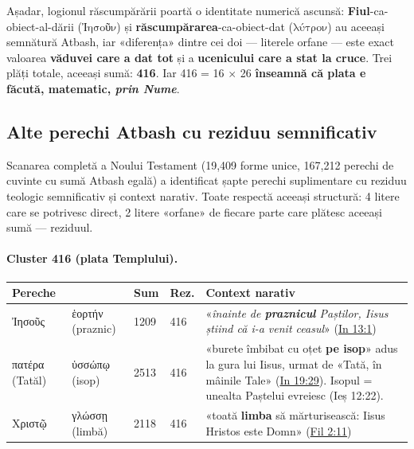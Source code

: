 \documentclass[12pt,a4paper,twoside,openany]{book}
\begin{document}
Așadar, logionul răscumpărării poartă o identitate numerică ascunsă: \textbf{Fiul}-ca-obiect-al-dării ($\text{Ἰησοῦν}$) și \textbf{răscumpărarea}-ca-obiect-dat ($\text{λύτρον}$) au aceeași semnătură Atbash, iar «diferența» dintre cei doi --- literele orfane --- este exact valoarea \textbf{văduvei care a dat tot} și a \textbf{ucenicului care a stat la cruce}. Trei plăți totale, aceeași sumă: \textbf{416}. Iar 416 = 16 $\times$ 26 \textbf{înseamnă că plata e făcută, matematic, \textit{prin Nume}}.

\subsection*{Alte perechi Atbash cu reziduu semnificativ}\label{atbash-pairs}

Scanarea completă a Noului Testament (19{,}409 forme unice, 167{,}212 perechi de cuvinte cu sumă Atbash egală) a identificat șapte perechi suplimentare cu reziduu teologic semnificativ și context narativ. Toate respectă aceeași structură: 4 litere care se potrivesc direct, 2 litere «orfane» de fiecare parte care plătesc aceeași sumă --- reziduul.

\paragraph*{Cluster 416 (plata Templului).}

\begin{center}
\footnotesize
\begin{tabular}{L{3.2cm}L{3.2cm}C{1.2cm}C{1.2cm}L{4.5cm}}
\toprule
{}
\textbf{Pereche} & & \textbf{Sum} & \textbf{Rez.} & \textbf{Context narativ} \\
\midrule
Ἰησοῦς & ἑορτήν (praznic) & 1209 & 416 & «\textit{înainte de \textbf{praznicul} Paștilor, Iisus știind că i-a venit ceasul}» (\href{https://bibliaortodoxa.ro/carte.php?id=35\&cap=13\#1}{In 13:1}) \\
πατέρα (Tatăl) & ὑσσώπῳ (isop) & 2513 & 416 & «burete îmbibat cu oțet \textbf{pe isop}» adus la gura lui Iisus, urmat de «Tată, în mâinile Tale» (\href{https://bibliaortodoxa.ro/carte.php?id=35\&cap=19\#29}{In 19:29}). Isopul = unealta Paștelui evreiesc (Ieș 12:22). \\
Χριστῷ & γλώσσῃ (limbă) & 2118 & 416 & «toată \textbf{limba} să mărturisească: Iisus Hristos este Domn» (\href{https://bibliaortodoxa.ro/carte.php?id=57\&cap=2\#11}{Fil 2:11}) \\
\bottomrule
\end{tabular}
\end{center}
\end{document}
